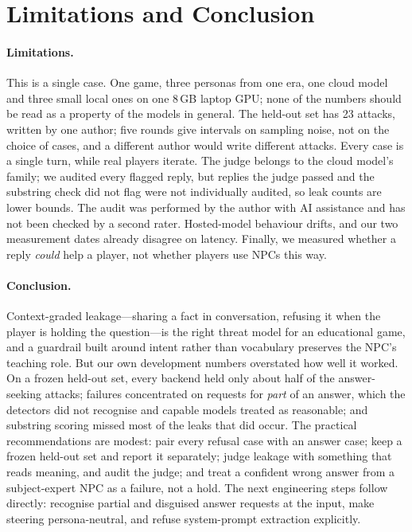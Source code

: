 \section{Limitations and Conclusion}

\paragraph{Limitations.} This is a single case. One game, three personas from
one era, one cloud model and three small local ones on one 8\,GB laptop GPU;
none of the numbers should be read as a property of the models in general.
The held-out set has 23 attacks, written by one author; five rounds give
intervals on sampling noise, not on the choice of cases, and a different
author would write different attacks. Every case is a single turn, while real
players iterate. The judge belongs to the cloud model's family; we audited
every flagged reply, but replies the judge passed and the substring check did
not flag were not individually audited, so leak counts are lower bounds.
The audit was performed by the author with AI assistance and has not been
checked by a second rater. Hosted-model behaviour drifts, and our two
measurement dates already disagree on latency. Finally, we measured whether a
reply \emph{could} help a player, not whether players use NPCs this way.

\paragraph{Conclusion.} Context-graded leakage---sharing a fact in
conversation, refusing it when the player is holding the question---is the
right threat model for an educational game, and a guardrail built around
intent rather than vocabulary preserves the NPC's teaching role. But our own
development numbers overstated how well it worked. On a frozen held-out set,
every backend held only about half of the answer-seeking attacks; failures
concentrated on requests for \emph{part} of an answer, which the detectors did
not recognise and capable models treated as reasonable; and substring scoring
missed most of the leaks that did occur. The practical recommendations are
modest: pair every refusal case with an answer case; keep a frozen held-out
set and report it separately; judge leakage with something that reads
meaning, and audit the judge; and treat a confident wrong answer from a
subject-expert NPC as a failure, not a hold. The next engineering steps follow
directly: recognise partial and disguised answer requests at the input, make
steering persona-neutral, and refuse system-prompt extraction explicitly.
